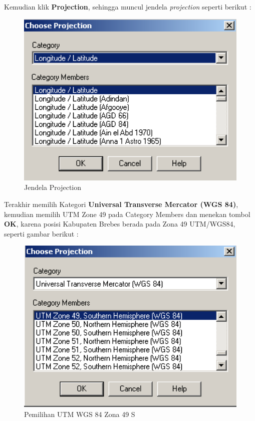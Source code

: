 Kemudian klik \textbf{Projection}, sehingga muncul jendela \textit{projection} seperti berikut :

\begin{figure}[H]
  \centering
  \includegraphics[width=1\textwidth]{./resources/046-jendela-projection}
  \caption{Jendela Projection}
\end{figure}

Terakhir memilih Kategori \textbf{Universal Transverse Mercator (WGS 84)}, kemudian memilih UTM Zone 49 pada Category Members dan menekan tombol \textbf{OK}, karena posisi Kabupaten Brebes berada pada Zona 49 UTM/WGS84, seperti gambar berikut :

\begin{figure}[H]
  \centering
  \includegraphics[width=1\textwidth]{./resources/047-pemilihan-utm-wgs84}
  \caption{Pemilihan UTM WGS 84 Zona 49 S}
\end{figure}